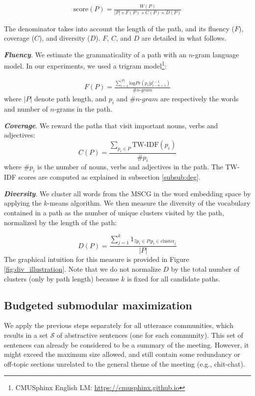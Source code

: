 \documentclass[11pt,a4paper]{article}
\begin{document}
\begin{equation}
\begin{aligned}
\mathrm{score}(P) = \frac{W(P)}{|P| \times F(P) \times C(P) \times D(P)}
\end{aligned}
\end{equation}

\noindent The denominator takes into account the length of the path, and its fluency ($F$), coverage ($C$), and diversity ($D$). $F$, $C$, and $D$ are detailed in what follows.

\textbf{\textit{Fluency}}. We estimate the grammaticality of a path with an $n$-gram language model. In our experiments, we used a trigram model\footnote{\tiny{CMUSphinx English LM: \url{https://cmusphinx.github.io}}}:

\begin{equation}
\begin{aligned}
F(P) = \frac{\sum^{|P|}_{i = 1} \mathrm{log} Pr (p_i |p_{i - n + 1}^{i - 1})}{\#n\text{-}gram}
\end{aligned}
\end{equation}
where $|P|$ denote path length, and $p_i$ and $\#n\text{-}gram$ are respectively the words and number of $n$-grams in the path.

\textbf{\textit{Coverage}}. We reward the paths that visit important nouns, verbs and adjectives:
\begin{equation} \label{eq:7}
C(P) = \frac{\sum_{p_i \in P} \mathrm{TW\text{-}IDF} (p_i)}{\#p_i}
\end{equation}
where $\#p_i$ is the number of nouns, verbs and adjectives in the path. The TW-IDF scores are computed as explained in subsection \ref{subsub:deg}.

\textbf{\textit{Diversity}}. We cluster all words from the MSCG in the word embedding space by applying the $k$-means algorithm. We then measure the diversity of the vocabulary contained in a path as the number of unique clusters visited by the path, normalized by the length of the path:

\begin{equation} \label{eq:div}
D(P) = \frac{\sum^k_{j = 1} 1_{\exists p_i \in P | p_i \in \mathrm{cluster}_j}}{|P|}
\end{equation}
The graphical intuition for this measure is provided in Figure \ref{fig:div_illustration}. Note that we do not normalize $D$ by the total number of clusters (only by path length) because $k$ is fixed for all candidate paths.

\subsection{Budgeted submodular maximization} \label{subsec:submodularity}
We apply the previous steps separately for all utterance communities, which results in a set $\mathcal{S}$ of abstractive sentences (one for each community). This set of sentences can already be considered to be a summary of the meeting. However, it might exceed the maximum size allowed, and still contain some redundancy or off-topic sections unrelated to the general theme of the meeting (e.g., chit-chat). 
\end{document}
